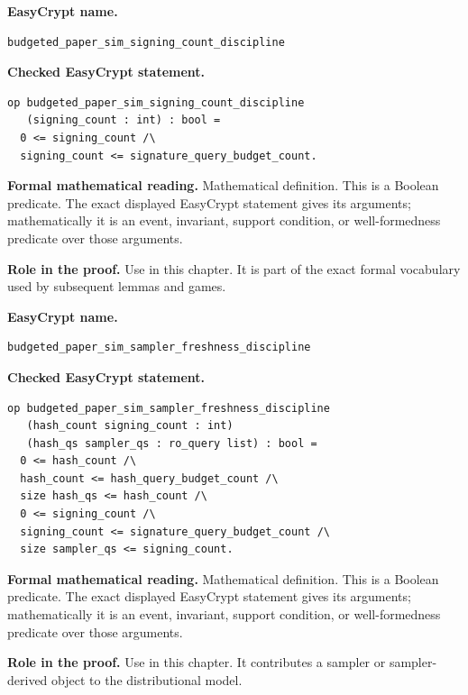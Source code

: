 \begin{formaldefinition}
\noindent\textbf{EasyCrypt name.}
\begin{lstlisting}[language=EasyCrypt,basicstyle=\ttfamily\scriptsize]
budgeted_paper_sim_signing_count_discipline
\end{lstlisting}
\noindent\textbf{Checked EasyCrypt statement.}
\begin{lstlisting}[language=EasyCrypt,basicstyle=\ttfamily\scriptsize]
op budgeted_paper_sim_signing_count_discipline
   (signing_count : int) : bool =
  0 <= signing_count /\
  signing_count <= signature_query_budget_count.
\end{lstlisting}
\noindent\textbf{Formal mathematical reading.}
Mathematical definition. This is a Boolean predicate.  The exact displayed EasyCrypt statement gives its arguments; mathematically it is an event, invariant, support condition, or well-formedness predicate over those arguments.

\noindent\textbf{Role in the proof.}
Use in this chapter. It is part of the exact formal vocabulary used by subsequent lemmas and games.

\end{formaldefinition}

\begin{formaldefinition}
\noindent\textbf{EasyCrypt name.}
\begin{lstlisting}[language=EasyCrypt,basicstyle=\ttfamily\scriptsize]
budgeted_paper_sim_sampler_freshness_discipline
\end{lstlisting}
\noindent\textbf{Checked EasyCrypt statement.}
\begin{lstlisting}[language=EasyCrypt,basicstyle=\ttfamily\scriptsize]
op budgeted_paper_sim_sampler_freshness_discipline
   (hash_count signing_count : int)
   (hash_qs sampler_qs : ro_query list) : bool =
  0 <= hash_count /\
  hash_count <= hash_query_budget_count /\
  size hash_qs <= hash_count /\
  0 <= signing_count /\
  signing_count <= signature_query_budget_count /\
  size sampler_qs <= signing_count.
\end{lstlisting}
\noindent\textbf{Formal mathematical reading.}
Mathematical definition. This is a Boolean predicate.  The exact displayed EasyCrypt statement gives its arguments; mathematically it is an event, invariant, support condition, or well-formedness predicate over those arguments.

\noindent\textbf{Role in the proof.}
Use in this chapter. It contributes a sampler or sampler-derived object to the distributional model.

\end{formaldefinition}

